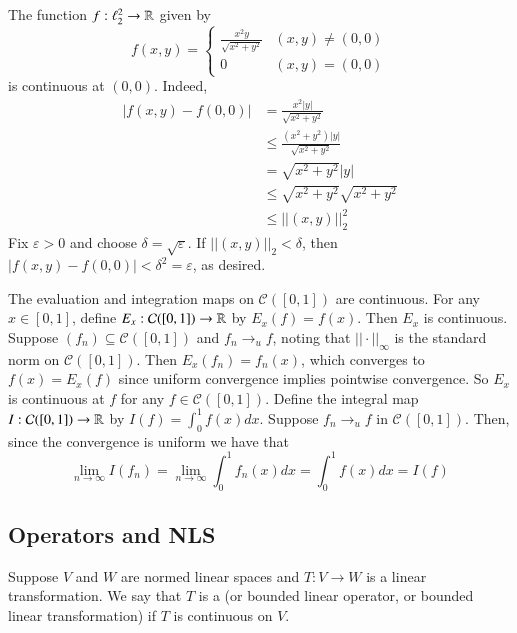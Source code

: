 \begin{example}
    The function $f:\ell_2^2\rightarrow \mathbb R$ given by $$f(x,y) = \left\{\begin{array}{cc} \frac{x^2y}{\sqrt{x^2+y^2}} & (x,y)\neq (0,0) \\ 0 & (x,y) = (0,0) \end{array}\right.$$ is continuous at $(0,0)$. Indeed, \begin{align*}
        |f(x,y) - f(0,0)| &= \frac{x^2|y|}{\sqrt{x^2+y^2}} \\
        &\leq \frac{(x^2+y^2)|y|}{\sqrt{x^2+y^2}} \\
        &= \sqrt{x^2+y^2}|y| \\
        &\leq \sqrt{x^2+y^2}\sqrt{x^2+y^2} \\
        &\leq ||(x,y)||_2^2
    \end{align*}
    Fix $\varepsilon > 0$ and choose $\delta = \sqrt{\varepsilon}$. If $||(x,y)||_2 < \delta$, then $|f(x,y) - f(0,0)| < \delta^2 = \varepsilon$, as desired.
\end{example}

\begin{example}
    The evaluation and integration maps on $\mathcal{C}([0,1])$ are continuous. For any $x \in [0,1]$, define $E_x:\mathcal{C}([0,1])\rightarrow \mathbb R$ by $E_x(f) = f(x)$. Then $E_x$ is continuous. Suppose $(f_n) \subseteq \mathcal{C}([0,1])$ and $f_n\rightarrow_uf$, noting that $||\cdot||_{\infty}$ is the standard norm on $\mathcal{C}([0,1])$. Then $E_x(f_n) = f_n(x)$, which converges to $f(x) = E_x(f)$ since uniform convergence implies pointwise convergence. So $E_x$ is continuous at $f$ for any $f \in \mathcal{C}([0,1])$. Define the integral map $I:\mathcal{C}([0,1])\rightarrow \mathbb R$ by $I(f) = \int_0^1f(x)dx$. Suppose $f_n\rightarrow_uf$ in $\mathcal{C}([0,1])$. Then, since the convergence is uniform we have that $$\lim\limits_{n\rightarrow \infty}I(f_n) = \lim\limits_{n\rightarrow \infty}\int_0^1f_n(x)dx = \int_0^1f(x)dx = I(f)$$
\end{example}


\subsection{Operators and NLS}

\begin{definition}
    Suppose $V$ and $W$ are normed linear spaces and $T:V\rightarrow W$ is a linear transformation. We say that $T$ is a  (or bounded linear operator, or bounded linear transformation) if $T$ is continuous on $V$.
\end{definition}

